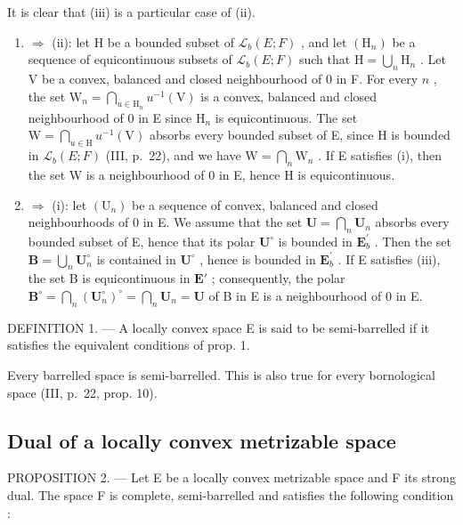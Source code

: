 It is clear that (iii) is a particular case of (ii).

\begin{enumerate}
\def\labelenumi{(\roman{enumi})}
\item
  \(\Rightarrow\) (ii): let H be a bounded subset of \(\mathcal{L}_b(E;F)\) , and let \((\mathrm{H}_n)\) be a sequence of equicontinuous subsets of \(\mathcal{L}_b(E;F)\) such that \(\mathrm{H} = \bigcup_{n}\mathrm{H}_{n}\) . Let V be a convex, balanced and closed neighbourhood of 0 in F. For every \(n\) , the set \(\mathrm{W}_n = \bigcap_{u\in \mathrm{H}_n}u^{-1}(\mathrm{V})\) is a convex, balanced and closed neighbourhood of 0 in E since \(\mathrm{H}_n\) is equicontinuous. The set \(\mathrm{W} = \bigcap_{u\in \mathrm{H}}u^{-1}(\mathrm{V})\) absorbs every bounded subset of E, since H is bounded in \(\mathcal{L}_b(E;F)\) (III, p.~22), and we have \(\mathrm{W} = \bigcap_{n}\mathrm{W}_{n}\) . If E satisfies (i), then the set W is a neighbourhood of 0 in E, hence H is equicontinuous.
\item
  \(\Rightarrow\) (i): let \((\mathrm{U}_n)\) be a sequence of convex, balanced and closed neighbourhoods of 0 in E. We assume that the set \(\mathbf{U} = \bigcap_{n}\mathbf{U}_{n}\) absorbs every bounded subset of E, hence that its polar \(\mathbf{U}^{\circ}\) is bounded in \(\mathbf{E}_b^\prime\) . Then the set \(\mathbf{B} = \bigcup_{n}\mathbf{U}_{n}^{\circ}\) is contained in \(\mathbf{U}^{\circ}\) , hence is bounded in \(\mathbf{E}_b^\prime\) . If E satisfies (iii), the set B is equicontinuous in \(\mathbf{E}'\) ; consequently, the polar \(\mathbf{B}^{\circ} = \bigcap_{n}(\mathbf{U}_{n}^{\circ})^{\circ} = \bigcap_{n}\mathbf{U}_{n} = \mathbf{U}\) of B in E is a neighbourhood of 0 in E.
\end{enumerate}

DEFINITION 1. --- A locally convex space E is said to be semi-barrelled if it satisfies the equivalent conditions of prop. 1.

Every barrelled space is semi-barrelled. This is also true for every bornological space (III, p.~22, prop. 10).

\subsection{Dual of a locally convex metrizable space}

PROPOSITION 2. --- Let E be a locally convex metrizable space and F its strong dual. The space F is complete, semi-barrelled and satisfies the following condition :

